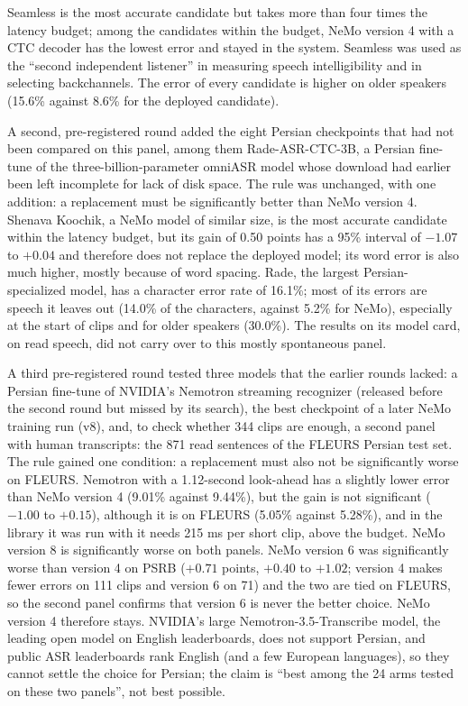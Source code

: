 Seamless is the most accurate candidate but takes more than four times the latency
budget; among the candidates within the budget, NeMo version 4 with a CTC decoder has the
lowest error and stayed in the system. Seamless was used as the ``second independent
listener'' in measuring speech intelligibility and in selecting backchannels. The error
of every candidate is higher on older speakers (15.6\% against 8.6\% for the deployed
candidate).

A second, pre-registered round added the eight Persian checkpoints that had not been
compared on this panel, among them Rade-ASR-CTC-3B, a Persian fine-tune of the
three-billion-parameter omniASR model whose download had earlier been left incomplete
for lack of disk space. The rule was unchanged, with one addition: a replacement must be
significantly better than NeMo version 4. Shenava Koochik, a NeMo model of similar size,
is the most accurate candidate within the latency budget, but its gain of 0.50 points has
a 95\% interval of $-1.07$ to $+0.04$ and therefore does not replace the deployed model;
its word error is also much higher, mostly because of word spacing. Rade, the largest
Persian-specialized model, has a character error rate of 16.1\%; most of its errors are
speech it leaves out (14.0\% of the characters, against 5.2\% for NeMo), especially at
the start of clips and for older speakers (30.0\%). The results on its model card, on
read speech, did not carry over to this mostly spontaneous panel.

A third pre-registered round tested three models that the earlier rounds lacked: a Persian
fine-tune of NVIDIA's Nemotron streaming recognizer (released before the second round but
missed by its search), the best checkpoint of a later NeMo training run (v8), and, to check
whether 344 clips are enough, a second panel with human transcripts: the 871 read sentences
of the FLEURS Persian test set. The rule gained one condition: a replacement must also not
be significantly worse on FLEURS. Nemotron with a 1.12-second look-ahead has a slightly
lower error than NeMo version 4 (9.01\% against 9.44\%), but the gain is not significant
($-1.00$ to $+0.15$), although it is on FLEURS (5.05\% against 5.28\%), and in the
library it was run with it needs 215 ms per short clip, above the budget. NeMo version 8 is
significantly worse on both panels. NeMo version 6 was significantly worse than version 4
on PSRB ($+0.71$ points, $+0.40$ to $+1.02$; version 4 makes fewer errors on 111 clips and
version 6 on 71) and the two are tied on FLEURS, so the second panel confirms that version
6 is never the better choice. NeMo version 4 therefore stays. NVIDIA's large
Nemotron-3.5-Transcribe model, the leading open model on English leaderboards, does not
support Persian, and public ASR leaderboards rank English (and a few European languages),
so they cannot settle the choice for Persian; the claim is ``best among the 24 arms
tested on these two panels'', not best possible.

